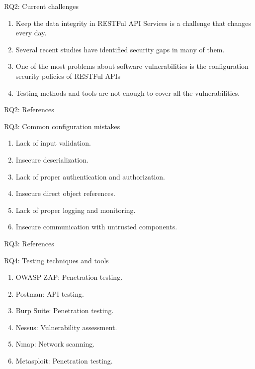 \documentclass[10pt]{beamer}
\theoremstyle{remark}
\theoremstyle{definition}
\begin{document}
\begin{frame}{RQ2: Current challenges}
  \begin{enumerate}
    \item Keep the data integrity in RESTFul API Services is a challenge that changes every day.
    \item Several recent studies have identified security gaps in many of them.
    \item One of the most problems about software vulnerabilities is the configuration security policies of RESTFul APIs
    \item Testing methods and tools are not enough to cover all the vulnerabilities.
  \end{enumerate}
\end{frame}

\begin{frame}{RQ2: References}
  \printbibliography[keyword={RQ2}]
    \end{frame}

  \begin{frame}{RQ3: Common configuration mistakes}
    \begin{enumerate}
      \item Lack of input validation.
      \item Insecure deserialization.
      \item Lack of proper authentication and authorization.
      \item Insecure direct object references.
      \item Lack of proper logging and monitoring.
        \item Insecure communication with untrusted components.
    \end{enumerate}
  \end{frame}

  \begin{frame}{RQ3: References}
    \printbibliography[keyword={RQ3}]
  \end{frame}

  \begin{frame}{RQ4: Testing techniques and tools}
    \begin{enumerate}
      \item OWASP ZAP: Penetration testing.
      \item Postman: API testing.
      \item Burp Suite: Penetration testing.
      \item Nessus: Vulnerability assessment.
      \item Nmap: Network scanning.
      \item Metasploit: Penetration testing.
    \end{enumerate}
  \end{frame}
\end{document}
